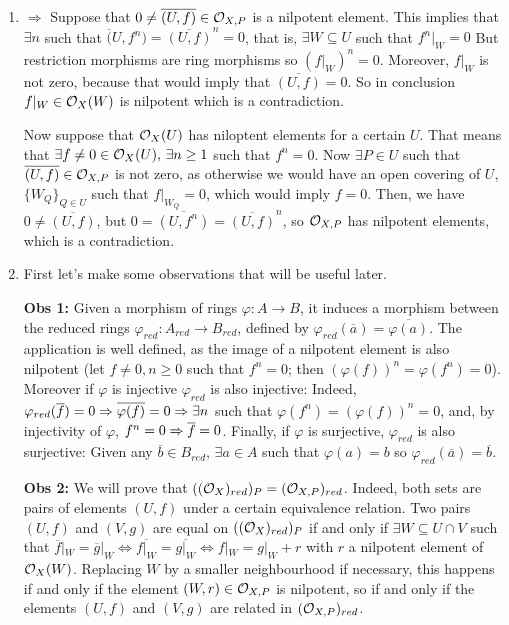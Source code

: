 \begin{sol}
	\begin{enumerate}[label=\alph*)]
		\item $\boxed{\Rightarrow}$ Suppose that $0 \neq \overline{(U,f)} \in \mathcal{O}_{X,P}$ is a nilpotent element. This implies that $\exists n$ such that $\overline({U, f^n}) = \overline{(U,f)}^n = 0$, that is, $\exists W \subseteq U$ such that $f^n|_{W} = 0$ But restriction morphisms are ring morphisms so $(f|_{W})^n = 0$. Moreover, $f|_W$ is not zero, because that would imply that $\overline{(U,f)} = 0$. So in conclusion $f|_W \in \mathcal{O}_X(W)$ is nilpotent which is a contradiction.

		\boxed{\Leftarrow} Now suppose that $\mathcal{O}_X(U)$ has niloptent elements for a certain $U$. That means that $\exists f \neq 0 \in \mathcal{O}_X(U), \, \exists n \geq 1$ such that $f^n = 0$. Now $\exists P \in U$ such that $\overline{(U,f)} \in \mathcal{O}_{X,P}$ is not zero, as otherwise we would have an open covering of $U$, $\{W_Q\}_{Q \in U}$ such that $f|_{W_Q} = 0$, which would imply $f = 0$. Then, we have $0 \neq \overline{(U,f)}$, but $0 = \overline{(U, f^n)} = \overline{(U,f)}^n$, so $\mathcal{O}_{X,P}$ has nilpotent elements, which is a contradiction.

		\item First let's make some observations that will be useful later. 

		\textbf{Obs 1:} Given a morphism of rings $\varphi: A \to B$, it induces a morphism between the reduced rings $\varphi_{red}:A_{red} \to B_{red}$, defined by $\varphi_{red}(\overline{a}) = \overline{\varphi(a)}$. The application is well defined, as the image of a nilpotent element is also nilpotent (let $f \neq 0, n \geq 0$ such that $f^n = 0$; then $(\varphi(f))^n = \varphi(f^n) = 0$). Moreover if $\varphi$ is injective $\varphi_{red}$ is also injective: Indeed, $\varphi_{red}(\overline{f}) = 0 \Rightarrow \overline{\varphi(f)} = 0 \Rightarrow \exists n$ such that $\varphi(f^n) = (\varphi(f))^n = 0$, and, by injectivity of $\varphi$, $f^n = 0 \Rightarrow \overline{f} = 0$. Finally, if $\varphi$ is surjective, $\varphi_{red}$ is also surjective: Given any $\overline{b} \in B_{red}$, $\exists a \in A$ such that $\varphi(a) = b$ so $\varphi_{red}(\overline{a}) = \overline{b}$.

		\textbf{Obs 2:} We will prove that $((\mathcal{O}_{X})_{red})_P = (\mathcal{O}_{X,P})_{red}$. Indeed, both sets are pairs of elements $(U,f)$ under a certain equivalence relation. Two pairs $(U,f)$ and $(V,g)$ are equal on $((\mathcal{O}_{X})_{red})_P$ if and only if $\exists W \subseteq U \cap V$ such that $\overline{f}|_W = \overline{g}|_W \iff \overline{f|_W} = \overline{g|_W} \iff f|_W = g|_W + r$ with $r$ a nilpotent element of $\mathcal{O}_X(W)$. Replacing $W$ by a smaller neighbourhood if necessary, this happens if and only if the element $(W,r) \in \mathcal{O}_{X,P}$ is nilpotent, so if and only if the elements $(U,f)$ and $(V,g)$ are related in $(\mathcal{O}_{X,P})_{red}$.


\end{enumerate}
\end{sol}
